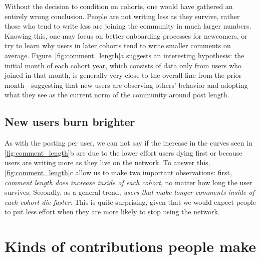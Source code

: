 Without the decision to condition on cohorts, one would have gathered an entirely wrong conclusion. People are not writing less as they survive, rather those who tend to write less are joining the community in much larger numbers. Knowing this, one may focus on better onboarding processes for newcomers, or try to learn why users in later cohorts tend to write smaller comments on average.  
Figure~\ref{fig:comment_length}a suggests an interesting hypothesis: the initial month of each cohort year, which consists of data only from users who joined in that month, is generally very close to the overall line from the prior month---suggesting that new users are observing others' behavior and adopting what they see as the current norm of the community around post length.  

\subsection{New users burn brighter}
As with the posting per user, we can not say if the increase in the curves seen in \ref{fig:comment_length}b are due to the lower effort users dying first or because users are writing more as they live on the network. To answer this, \ref{fig:comment_length}c allow us to make two important observations: first, \textit{comment length does increase inside of each cohort}, no matter how long the user survives. Secondly, as a general trend, \textit{users that make longer comments inside of each cohort die faster}. This is quite surprising, given that we would expect people to put less effort when they are more likely to stop using the network.


\section{Kinds of contributions people make}

